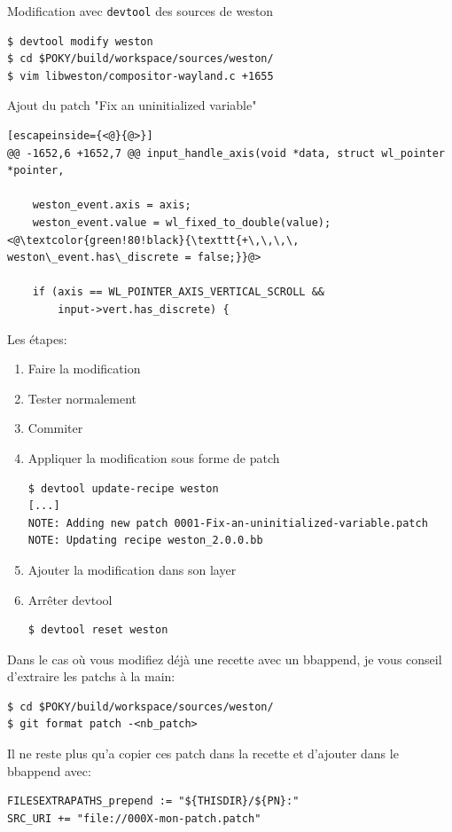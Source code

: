 \documentclass[compress]{beamer}
\begin{document}
\begin{frame}[fragile]
Modification avec \texttt{devtool} des sources de weston
\begin{lstlisting}[style=shell]
$ devtool modify weston
$ cd $POKY/build/workspace/sources/weston/
$ vim libweston/compositor-wayland.c +1655
\end{lstlisting}

Ajout du patch "Fix an uninitialized variable"
\begin{lstlisting}[escapeinside={<@}{@>}]
@@ -1652,6 +1652,7 @@ input_handle_axis(void *data, struct wl_pointer *pointer,
 
 	weston_event.axis = axis;
 	weston_event.value = wl_fixed_to_double(value);
<@\textcolor{green!80!black}{\texttt{+\,\,\,\, weston\_event.has\_discrete = false;}}@>
 
 	if (axis == WL_POINTER_AXIS_VERTICAL_SCROLL &&
 	    input->vert.has_discrete) {
\end{lstlisting}
\end{frame}

\begin{frame}[fragile]
Les étapes:
\begin{enumerate}
\item Faire la modification
\item Tester normalement
\item Commiter
\item Appliquer la modification sous forme de patch
\begin{lstlisting}[style=shell]
$ devtool update-recipe weston
[...]
NOTE: Adding new patch 0001-Fix-an-uninitialized-variable.patch
NOTE: Updating recipe weston_2.0.0.bb
\end{lstlisting}
\item Ajouter la modification dans son layer
\item Arrêter devtool
\begin{lstlisting}[style=shell]
$ devtool reset weston
\end{lstlisting}
\end{enumerate}
\end{frame}

\begin{frame}[fragile]
Dans le cas où vous modifiez déjà une recette avec un bbappend, je vous conseil d'extraire les patchs à la main:
\begin{lstlisting}[style=shell]
$ cd $POKY/build/workspace/sources/weston/
$ git format patch -<nb_patch>
\end{lstlisting}
Il ne reste plus qu'a copier ces patch dans la recette et d'ajouter dans le bbappend avec:
\begin{lstlisting}[style=shell]
FILESEXTRAPATHS_prepend := "${THISDIR}/${PN}:"
SRC_URI += "file://000X-mon-patch.patch"
\end{lstlisting}
\end{frame}
\end{document}
